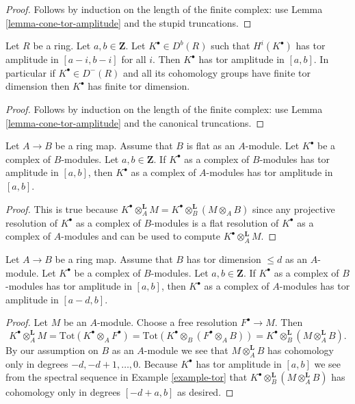 \begin{proof}
Follows by induction on the length of the finite complex: use
Lemma \ref{lemma-cone-tor-amplitude}
and the stupid truncations.
\end{proof}

\begin{lemma}
\label{lemma-cohomology-tor-amplitude}
Let $R$ be a ring. Let $a, b \in \mathbf{Z}$. Let $K^\bullet \in D^b(R)$
such that $H^i(K^\bullet)$ has tor amplitude in $[a - i, b - i]$
for all $i$. Then $K^\bullet$ has tor amplitude in $[a, b]$. In particular
if $K^\bullet \in D^{-}(R)$ and all its cohomology groups have finite tor
dimension then $K^\bullet$ has finite tor dimension.
\end{lemma}

\begin{proof}
Follows by induction on the length of the finite complex: use
Lemma \ref{lemma-cone-tor-amplitude}
and the canonical truncations.
\end{proof}

\begin{lemma}
\label{lemma-flat-push-tor-amplitude}
Let $A \to B$ be a ring map. Assume that $B$ is flat as an
$A$-module. Let $K^\bullet$ be a complex of $B$-modules.
Let $a, b \in \mathbf{Z}$. If $K^\bullet$ as a complex of $B$-modules
has tor amplitude in $[a, b]$, then $K^\bullet$ as a complex of
$A$-modules has tor amplitude in $[a, b]$.
\end{lemma}

\begin{proof}
This is true because
$K^\bullet \otimes_A^{\mathbf{L}} M =
K^\bullet \otimes_B^{\mathbf{L}} (M \otimes_A B)$
since any projective resolution of $K^\bullet$ as a complex of $B$-modules
is a flat resolution of $K^\bullet$ as a complex of $A$-modules and
can be used to compute $K^\bullet \otimes_A^{\mathbf{L}} M$.
\end{proof}

\begin{lemma}
\label{lemma-finite-tor-dimension-push-tor-amplitude}
Let $A \to B$ be a ring map. Assume that $B$ has tor dimension $\leq d$
as an $A$-module. Let $K^\bullet$ be a complex of $B$-modules.
Let $a, b \in \mathbf{Z}$. If $K^\bullet$ as a complex of $B$-modules
has tor amplitude in $[a, b]$, then $K^\bullet$ as a complex of
$A$-modules has tor amplitude in $[a - d, b]$.
\end{lemma}

\begin{proof}
Let $M$ be an $A$-module. Choose a free resolution $F^\bullet \to M$.
Then
$$
K^\bullet \otimes_A^{\mathbf{L}} M =
\text{Tot}(K^\bullet \otimes_A F^\bullet) =
\text{Tot}(K^\bullet \otimes_B (F^\bullet \otimes_A B)) =
K^\bullet \otimes_B^{\mathbf{L}} (M \otimes_A^{\mathbf{L}} B).
$$
By our assumption on $B$ as an $A$-module we see that
$M \otimes_A^{\mathbf{L}} B$ has cohomology only in degrees
$-d, -d + 1, \ldots, 0$. Because $K^\bullet$ has tor amplitude in
$[a, b]$ we see from the spectral sequence in
Example \ref{example-tor}
that $K^\bullet \otimes_B^{\mathbf{L}} (M \otimes_A^{\mathbf{L}} B)$
has cohomology only in degrees $[-d + a, b]$ as desired.
\end{proof}

